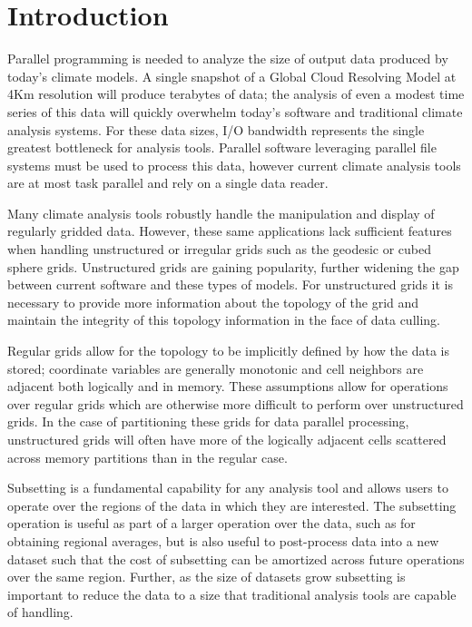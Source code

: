 \section{Introduction}
\label{section:introduction}

Parallel programming is needed to analyze the size of output data produced by
today's climate models\cite{MODSIM07:LOT}.  A single snapshot of a Global
Cloud Resolving Model at 4Km resolution will produce terabytes of
data\cite{GCRM}; the analysis of even a modest time series of this data will
quickly overwhelm today's software and traditional climate analysis systems.
For these data sizes, I/O bandwidth represents the single greatest bottleneck
for analysis tools.  Parallel software leveraging parallel file systems must
be used to process this data, however current climate analysis tools are at
most task parallel and rely on a single data reader\cite{CDAT,CDO,NCO}.

Many climate analysis tools robustly handle the manipulation and display of
regularly gridded data.  However, these same applications lack sufficient
features when handling unstructured or irregular grids such as the
geodesic\cite{GEODESIC} or cubed sphere\cite{CUBE} grids.  Unstructured grids
are gaining popularity, further widening the gap between current software and
these types of models.  For unstructured grids it is necessary to provide more
information about the topology of the grid and maintain the integrity of this
topology information in the face of data culling.

Regular grids allow for the topology to be implicitly defined by how
the data is stored; coordinate variables are generally monotonic and cell
neighbors are adjacent both logically and in memory. These assumptions allow
for operations over regular grids which are otherwise more difficult to
perform over unstructured grids. In the case of partitioning these grids for
data parallel processing, unstructured grids will often have more of the
logically adjacent cells scattered across memory partitions than in the
regular case.

Subsetting is a fundamental capability for any analysis tool and allows users
to operate over the regions of the data in which they are interested. The
subsetting operation is useful as part of a larger operation over the data,
such as for obtaining regional averages, but is also useful to post-process
data into a new dataset such that the cost of subsetting can be amortized
across future operations over the same region. Further, as the size of
datasets grow subsetting is important to reduce the data to a size that
traditional analysis tools are capable of handling. 

